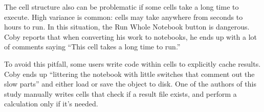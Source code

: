 The cell structure also can be problematic if some cells take a long time to
execute. High variance is common: cells may take anywhere from seconds to
hours to run.  In this situation, the Run Whole Notebook button is dangerous.
Coby reports that when converting his work to notebooks, he
ends up with a lot of comments saying ``This cell takes a long time to run.''

To avoid this pitfall, some users write code within cells to explicitly cache results.
Coby ends up ``littering the notebook with little switches that comment out the
slow parts'' and either load or save the object to disk. One of the authors of this study
manually writes cells that check if a result file exists, and perform a calculation only
if it's needed.








